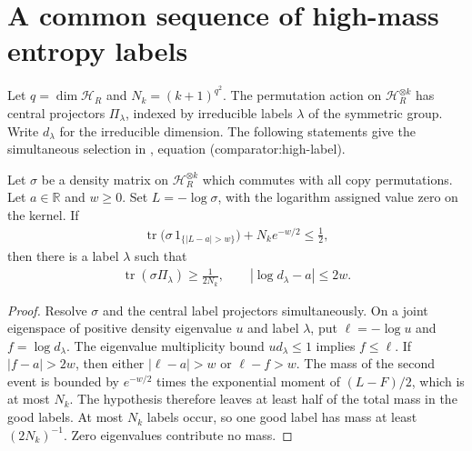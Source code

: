 \section{A common sequence of high-mass entropy labels}
\label{sec:high_label_window}

Let $q=\dim\mathcal H_R$ and $N_k=(k+1)^{q^2}$. The permutation action
on $\mathcal H_R^{\otimes k}$ has central projectors $\Pi_\lambda$,
indexed by irreducible labels $\lambda$ of the symmetric group. Write
$d_\lambda$ for the irreducible dimension. The following statements give
the simultaneous selection in \cite[Section~7]{OpenAI2026AreaLaw},
equation \textup{(comparator:high-label)}.

\begin{theorem}
\label{thm:high_label_finite_window}
\leanok
Let $\sigma$ be a density matrix on $\mathcal H_R^{\otimes k}$ which
commutes with all copy permutations. Let $a\in\mathbb R$ and $w\ge0$.
Set $L=-\log\sigma$, with the logarithm assigned value zero on the kernel.
If
\begin{align}
 \operatorname{tr}\bigl(\sigma\,1_{\{|L-a|>w\}}\bigr)
       +N_k e^{-w/2}\le\tfrac12,
\end{align}
then there is a label $\lambda$ such that
\begin{align}
 \operatorname{tr}(\sigma\Pi_\lambda)\ge\frac1{2N_k},
 \qquad |\log d_\lambda-a|\le2w.
\end{align}
\end{theorem}
\begin{proof}
\leanok
Resolve $\sigma$ and the central label projectors simultaneously. On a
joint eigenspace of positive density eigenvalue $u$ and label $\lambda$,
put $\ell=-\log u$ and $f=\log d_\lambda$. The eigenvalue multiplicity
bound $u d_\lambda\le1$ implies $f\le\ell$.
If $|f-a|>2w$, then either $|\ell-a|>w$ or $\ell-f>w$.
The mass of the second event is bounded by $e^{-w/2}$ times the
exponential moment of $(L-F)/2$, which is at most $N_k$.
The hypothesis therefore leaves at least half of the total mass in the
good labels. At most $N_k$ labels occur, so one good label has mass at
least $(2N_k)^{-1}$. Zero eigenvalues contribute no mass.
\end{proof}

